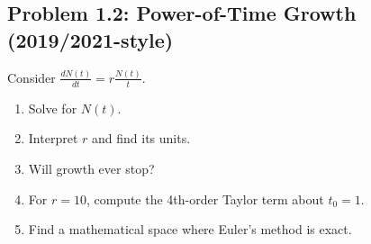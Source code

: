\documentclass[10pt]{article}
\begin{document}
\subsection{Problem 1.2: Power-of-Time Growth (2019/2021-style)}

\begin{problem}
Consider $\frac{dN(t)}{dt} = r\frac{N(t)}{t}$.

\begin{enumerate}[label=(\alph*)]
\item Solve for $N(t)$.
\item Interpret $r$ and find its units.
\item Will growth ever stop?
\item For $r = 10$, compute the 4th-order Taylor term about $t_0 = 1$.
\item Find a mathematical space where Euler's method is exact.
\end{enumerate}
\end{problem}
\end{document}
